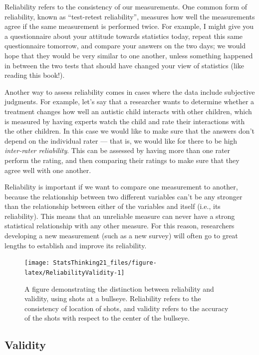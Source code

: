 \documentclass[12pt,]{book}
\theoremstyle{definition}
\theoremstyle{definition}
\theoremstyle{definition}
\theoremstyle{remark}
\begin{document}
Reliability refers to the consistency of our measurements. One common form of reliability, known as ``test-retest reliability'', measures how well the measurements agree if the same measurement is performed twice. For example, I might give you a questionnaire about your attitude towards statistics today, repeat this same questionnaire tomorrow, and compare your answers on the two days; we would hope that they would be very similar to one another, unless something happened in between the two tests that should have changed your view of statistics (like reading this book!).

Another way to assess reliability comes in cases where the data include subjective judgments. For example, let's say that a researcher wants to determine whether a treatment changes how well an autistic child interacts with other children, which is measured by having experts watch the child and rate their interactions with the other children. In this case we would like to make sure that the answers don't depend on the individual rater --- that is, we would like for there to be high \emph{inter-rater reliability}. This can be assessed by having more than one rater perform the rating, and then comparing their ratings to make sure that they agree well with one another.

Reliability is important if we want to compare one measurement to another, because the relationship between two different variables can't be any stronger than the relationship between either of the variables and itself (i.e., its reliability). This means that an unreliable measure can never have a strong statistical relationship with any other measure. For this reason, researchers developing a new measurement (such as a new survey) will often go to great lengths to establish and improve its reliability.

\begin{figure}
\texttt{[image: StatsThinking21\_files/figure-latex/ReliabilityValidity-1]} \caption{A figure demonstrating the distinction between reliability and validity, using shots at a bullseye. Reliability refers to the consistency of location of shots, and validity refers to the accuracy of the shots with respect to the center of the bullseye. }\label{fig:ReliabilityValidity}
\end{figure}

\hypertarget{validity}{%
\subsection{Validity}\label{validity}}
\end{document}
